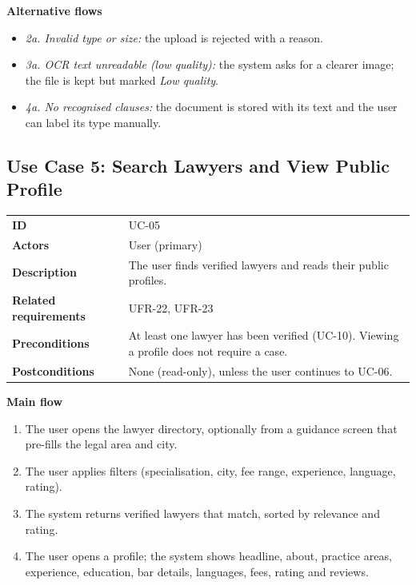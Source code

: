 \textbf{Alternative flows}

\begin{itemize}
  \item \emph{2a. Invalid type or size:} the upload is rejected with a reason.
  \item \emph{3a. OCR text unreadable (low quality):} the system asks for a clearer image; the file is kept but marked \emph{Low quality}.
  \item \emph{4a. No recognised clauses:} the document is stored with its text and the user can label its type manually.
\end{itemize}

\subsection{Use Case 5: Search Lawyers and View Public Profile}

\begin{center}
\begin{tabular}{|L{4.04cm}|L{10.89cm}|}
\hline\headrow {} &  \\ \hline
\textbf{ID} & UC-05 \\ \hline
\textbf{Actors} & User (primary) \\ \hline
\textbf{Description} & The user finds verified lawyers and reads their public profiles. \\ \hline
\textbf{Related requirements} & UFR-22, UFR-23 \\ \hline
\textbf{Preconditions} & At least one lawyer has been verified (UC-10). Viewing a profile does not require a case. \\ \hline
\textbf{Postconditions} & None (read-only), unless the user continues to UC-06. \\ \hline
\end{tabular}
\end{center}

\textbf{Main flow}

\begin{enumerate}
  \item The user opens the lawyer directory, optionally from a guidance screen that pre-fills the legal area and city.
  \item The user applies filters (specialisation, city, fee range, experience, language, rating).
  \item The system returns verified lawyers that match, sorted by relevance and rating.
  \item The user opens a profile; the system shows headline, about, practice areas, experience, education, bar details, languages, fees, rating and reviews.
\end{enumerate}


